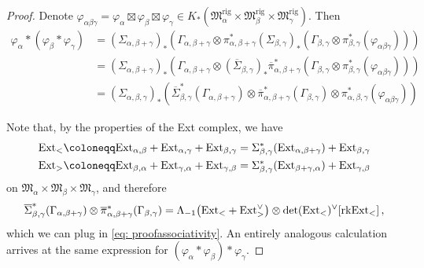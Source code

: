\documentclass[12pt]{amsart}
\theoremstyle{definition}
\newcommand{\1}{\mathbf 1}
\newcommand{\FM}{{\mathfrak{M}}}
\newcommand{\Ext}{\mathcal{E}\text{xt}}
\newcommand{\rk}{\mathrm{rk}}
\newcommand{\rig}{\mathrm{rig}}
\renewcommand{\Ext}{\textup{Ext}}
\begin{document}
\begin{proof}
Denote $\varphi_{\alpha\beta\gamma}=\varphi_\alpha\boxtimes\varphi_\beta\boxtimes \varphi_\gamma\in K_\ast(\FM_\alpha^\rig\times \FM_\beta^\rig\times \FM_\gamma^\rig)$. Then
\begin{align}\label{eq: proofassociativity}
    \varphi_\alpha\ast(\varphi_\beta\ast \varphi_\gamma)&=(\Sigma_{\alpha, \beta+\gamma})_\ast\left(\Gamma_{\alpha, \beta+\gamma}\otimes \pi_{\alpha, \beta+\gamma}^\ast(\Sigma_{\beta, \gamma})_\ast\left(\Gamma_{\beta, \gamma}\otimes \pi_{\beta, \gamma}^\ast(\varphi_{\alpha\beta\gamma})\right)\right)\\
    &\nonumber =(\Sigma_{\alpha, \beta+\gamma})_\ast\left(\Gamma_{\alpha, \beta+\gamma}\otimes (\overline\Sigma_{\beta, \gamma})_\ast\overline\pi_{\alpha, \beta+\gamma}^\ast\left(\Gamma_{\beta, \gamma}\otimes \pi_{\beta, \gamma}^\ast(\varphi_{\alpha\beta\gamma})\right)\right)\\
    &\nonumber =(\Sigma_{\alpha, \beta, \gamma})_\ast \left(\overline \Sigma_{\beta, \gamma}^\ast(\Gamma_{\alpha, \beta+\gamma})\otimes \overline\pi_{\alpha, \beta+\gamma}^\ast(\Gamma_{\beta, \gamma})\otimes \pi_{\alpha, \beta, \gamma}^\ast(\varphi_{\alpha\beta\gamma})\right)
\end{align}

Note that, by the properties of the Ext complex, we have
\begin{align*}\Ext_{<}&\coloneqq \Ext_{\alpha, \beta}+\Ext_{\alpha, \gamma}+\Ext_{\beta, \gamma}=\Sigma_{\beta,\gamma}^\ast(\Ext_{\alpha, \beta+\gamma})+\Ext_{\beta, \gamma}\\
\Ext_{>}&\coloneqq \Ext_{\beta, \alpha}+\Ext_{\gamma, \alpha}+\Ext_{\gamma, \beta}=\Sigma_{\beta,\gamma}^\ast(\Ext_{\beta+\gamma, \alpha})+\Ext_{ \gamma, \beta}
\end{align*}
on $\FM_{\alpha}\times \FM_\beta\times \FM_\gamma$, and therefore
\[\overline \Sigma_{\beta, \gamma}^\ast(\Gamma_{\alpha, \beta+\gamma})\otimes \overline\pi_{\alpha, \beta+\gamma}^\ast(\Gamma_{\beta, \gamma})=\Lambda_{-1}\big(\Ext_{<}+\Ext_{>}^\vee\big)\otimes \det(\Ext_{<})^\vee[\rk \Ext_{<}]\,,\]
which we can plug in \eqref{eq: proofassociativity}. An entirely analogous calculation arrives at the same expression for $(\varphi_\alpha\ast \varphi_\beta)\ast \varphi_\gamma$. 
\end{proof}
\end{document}
